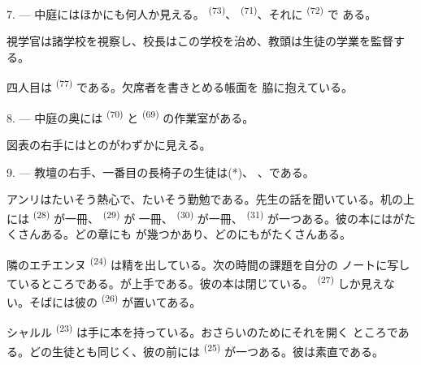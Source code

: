 7. --- 中庭にはほかにも何人か見える。 \textsuperscript{(73)}、
 \textsuperscript{(71)}、それに \textsuperscript{(72)} で
ある。

視学官は諸学校を視察し、校長はこの学校を治め、教頭は生徒の学業を監督する。

四人目は \textsuperscript{(77)} である。欠席者を書きとめる帳面を
脇に抱えている。

8. --- 中庭の奥には \textsuperscript{(70)} と
\textsuperscript{(69)} の作業室がある。

図表の右手にはとのがわずかに見える。


\VUsaut{2.4mm}

\VUsaut{3.0mm}

9. --- 教壇の右手、一番目の長椅子の生徒は(*)、
、である。

アンリはたいそう熱心で、たいそう勤勉である。先生の話を聞いている。机の上には
 \textsuperscript{(28)} が一冊、 \textsuperscript{(29)} が
一冊、 \textsuperscript{(30)} が一冊、
\textsuperscript{(31)} が一つある。彼の本にはがたくさんある。どの章にも
が幾つかあり、どのにもがたくさんある。

隣のエチエンヌ \textsuperscript{(24)} は精を出している。次の時間の課題を自分の
ノートに写しているところである。が上手である。彼の本は閉じている。
 \textsuperscript{(27)} しか見えない。そばには彼の
\textsuperscript{(26)} が置いてある。

シャルル \textsuperscript{(23)} は手に本を持っている。おさらいのためにそれを開く
ところである。どの生徒とも同じく、彼の前には
\textsuperscript{(25)} が一つある。彼は素直である。


